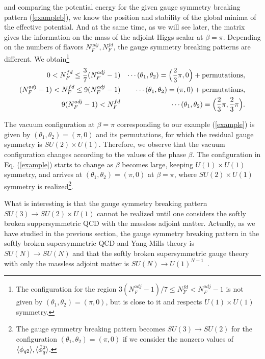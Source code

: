 \documentclass[a4paper,12pt]{article}
\begin{document}
and comparing the potential energy for the given gauge symmetry 
breaking pattern (\ref{exampleb}),
we know the position and stability of the global minima of the
effective potential. And at the same time, as we will see later, the matrix
gives the information on the mass of the adjoint Higgs scalar at $\beta=\pi$.
Depending on the numbers of flavors $N_F^{adj}, N_F^{fd}$, the gauge
symmetry breaking patterns are different.
We obtain\footnote{The configuration for 
the region $3(N_F^{adj}-1)/7 \leq N_F^{fd} < N_F^{adj}-1$ is not 
given by $(\theta_1, \theta_2)=(\pi, 0)$, but is close to it and respects
$U(1)\times U(1)$ symmetry.}
\begin{eqnarray}
0< N_F^{fd} \leq {3\over 7}(N_F^{adj}-1)& &\cdots 
(\theta_1,\theta_2)=\Bigl({2\over 3}\pi, 0\Bigr)+{\rm permutations},
\nonumber\\
(N_F^{adj}-1)< N_F^{fd} \leq 9(N_F^{adj}-1)& &\cdots 
(\theta_1,\theta_2)=(\pi, 0)+{\rm permutations},
\nonumber\\
9(N_F^{adj}-1) <  N_F^{fd} & &\cdots 
(\theta_1,\theta_2)=\Bigl({2\over 3}\pi, {2\over 3}\pi\Bigr).
\label{hessianb}
\end{eqnarray}
\par
The vacuum configuration at $\beta=\pi$ corresponding to our example 
(\ref{example}) is given by $(\theta_1, \theta_2)
=(\pi, 0)$ and its permutations, for which the 
residual gauge symmetry is $SU(2)\times U(1)$.
Therefore, we observe that the vacuum configuration changes according to the
values of the phase $\beta$. The configuration in Eq. (\ref{example}) starts 
to change as $\beta$ becomes large, keeping $U(1)\times U(1)$ symmetry,
and arrives at $(\theta_1, \theta_2)=(\pi, 0)$ 
at $\beta=\pi$, where $SU(2) \times U(1)$
symmetry is realized\footnote{The gauge symmetry breaking pattern becomes
$SU(3)\rightarrow SU(2)$ for the 
configuration $(\theta_1,\theta_2)=(\pi, 0)$ if we consider 
the nonzero values of $\langle \phi_{q2} \rangle, \langle {\bar\phi}_q^{2} \rangle$.}.
\par
What is interesting is that the gauge symmetry breaking pattern
$SU(3)\rightarrow SU(2)\times U(1)$ cannot be 
realized until one considers the softly
broken suppersymmetric QCD with the massless adjoint matter. Actually, as we
have studied in the previous section, the gauge symmetry breaking pattern 
in the softly broken supersymmetric QCD and Yang-Mills 
theory is $SU(N)\rightarrow SU(N)$ and that the 
softly broken supersymmetric gauge theory with only the massless
adjoint matter is $SU(N)\rightarrow U(1)^{N-1}$~\cite{takenagab}. 
\end{document}
